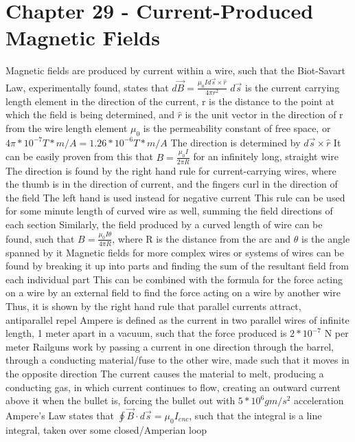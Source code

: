 \documentclass[11 pt, twoside]{article}
\newenvironment{outline*}
{
	\begin{outline}[enumerate]
	}
	{\end{outline}
}
\begin{document}
\section{Chapter 29 - Current-Produced Magnetic Fields}
\begin{outline*}
\1 Magnetic fields are produced by current within a wire, such that the Biot-Savart Law, experimentally found, states that $d\vec{B} = \frac{\mu_0 Id\vec{s} \times \hat{r}}{4\pi r^2}$
\2 $d\vec{s}$ is the current carrying length element in the direction of the current, r is the distance to the point at which the field is being determined, and $\hat{r}$ is the unit vector in the direction of r from the wire length element
\2 $\mu_0$ is the permeability constant of free space, or $4\pi * 10^{-7} T*m/A = 1.26 * 10^{-6} T*m/A$
\2 The direction is determined by $d\vec{s} \times \hat{r}$
\2 It can be easily proven from this that $B = \frac{\mu_0 I}{2\pi R}$ for an infinitely long, straight wire
\3 The direction is found by the right hand rule for current-carrying wires, where the thumb is in the direction of current, and the fingers curl in the direction of the field
\4 The left hand is used instead for negative current
\4 This rule can be used for some minute length of curved wire as well, summing the field directions of each section
\2 Similarly, the field produced by a curved length of wire can be found, such that $B = \frac{\mu_0I\theta}{4\pi R}$, where R is the distance from the arc and $\theta$ is the angle spanned by it
\2 Magnetic fields for more complex wires or systems of wires can be found by breaking it up into parts and finding the sum of the resultant field from each individual part
\2 This can be combined with the formula for the force acting on a wire by an external field to find the force acting on a wire by another wire
\3 Thus, it is shown by the right hand rule that parallel currents attract, antiparallel repel
 Ampere is defined as the current in two parallel wires of infinite length, 1 meter apart in a vacuum, such that the force produced is $2*10^{-7}$ N per meter
\3 Railguns work by passing a current in one direction through the barrel, through a conducting material/fuse to the other wire, made such that it moves in the opposite direction 
\4 The current causes the material to melt, producing a conducting gas, in which current continues to flow, creating an outward current above it when the bullet is, forcing the bullet out with $5 * 10^6g m/s^2$ acceleration
\1 Ampere's Law states that $\oint \vec{B} \cdot d\vec{s} = \mu_0 I_{enc}$, such that the integral is a line integral, taken over some closed/Amperian loop

\end{outline*}
\end{document}
